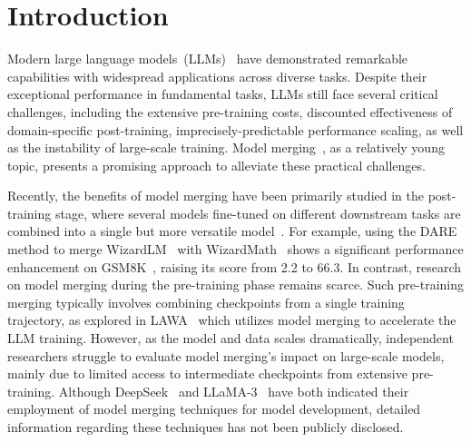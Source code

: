 \section{Introduction}
Modern large language models~(LLMs)~\citep{seed2025seed, achiam2023gpt,guo2025deepseek,team2024gemini,yang2024qwen2} have demonstrated remarkable capabilities with widespread applications across diverse tasks. Despite their exceptional performance in fundamental tasks, LLMs still face several critical challenges, including the extensive pre-training costs, discounted effectiveness of domain-specific post-training, imprecisely-predictable performance scaling, as well as the instability of large-scale training. Model merging~\citep{yang2024model}, as a relatively young topic, presents a promising approach to alleviate these practical challenges. 

Recently, the benefits of model merging have been primarily studied in the post-training stage, where several models fine-tuned on different downstream tasks are combined into a single but more versatile model~\citep{ilharco2022editing,zhou2024metagpt,yu2024language}. For example, using the DARE~\citep{yu2024language} method to merge WizardLM~\citep{xu2023wizardlm} with WizardMath~\citep{luo2023wizardmath} shows a significant performance enhancement on GSM8K~\citep{cobbe2021training}, raising its score from 2.2 to 66.3. In contrast, research on model merging during the pre-training phase remains scarce. Such pre-training merging typically involves combining checkpoints from a single training trajectory, as explored in LAWA~\citep{kaddour2022stop} which utilizes model merging to accelerate the LLM training. However, as the model and data scales dramatically, independent researchers struggle to evaluate model merging's impact on large-scale models, mainly due to limited access to intermediate checkpoints from extensive pre-training. Although DeepSeek~\citep{liu2024deepseek} and LLaMA-3~\citep{grattafiori2024llama} have both indicated their employment of model merging techniques for model development, detailed information regarding these techniques has not been publicly disclosed.

